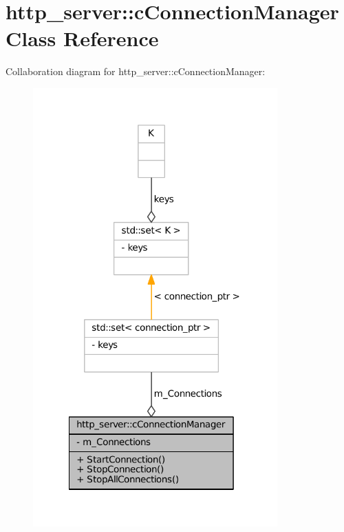 \hypertarget{classhttp__server_1_1cConnectionManager}{
\section{http\-\_\-server\-:\-:c\-Connection\-Manager \-Class \-Reference}
\label{classhttp__server_1_1cConnectionManager}
}


\-Collaboration diagram for http\-\_\-server\-:\-:c\-Connection\-Manager\-:
\nopagebreak
\begin{figure}[H]
\begin{center}
\leavevmode
\includegraphics[width=266pt]{classhttp__server_1_1cConnectionManager__coll__graph}
\end{center}
\end{figure}
